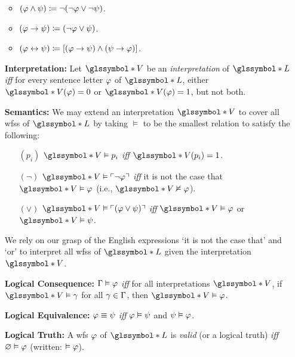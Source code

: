 \documentclass[a4paper, 11pt]{article} %
\newcommand{\g}{\glssymbol*}%
\begin{document}
\begin{enumerate}[leftmargin=1.2in,labelsep=.15in]
    \begin{itemize}\small
      \item $(\varphi\wedge \psi) \coloneq \neg(\neg \varphi\vee\neg \psi)$.
      \item $(\varphi\rightarrow \psi) \coloneq (\neg \varphi\vee \psi)$.
      \item $(\varphi\leftrightarrow \psi) \coloneq [(\varphi\rightarrow \psi)\wedge(\psi\rightarrow \varphi)]$.
    \end{itemize}
  \item[\bf Interpretation:] Let $\g{V}$ be an \textit{interpretation} of $\g{L}$ \textit{iff} for every sentence letter $\varphi$ of $\g{L}$, either $\g{V}(\metaA)=0$ or $\g{V}(\metaA)=1$, but not both.
  \item[\bf Semantics:] We may extend an interpretation $\g{V}$ to cover all wfss of $\g{L}$ by taking $\vDash$ to be the smallest relation to satisfy the following:
  \begin{itemize}[leftmargin=.36in]\small
  \item[$(p_i)$] $\g{V}\vDash p_i$ \textit{iff} $\g{V}(p_i)=1$.
  \item[$(\neg)$] $\g{V}\vDash \corner{\neg \metaA}$ \textit{iff} it is not the case that $\g{V}\vDash \metaA$ (i.e., $\g{V}\nvDash \metaA$). %
  \item[$(\vee)$] $\g{V}\vDash \corner{(\metaA\vee \metaB)}$ \textit{iff} $\g{V}\vDash \metaA$ or $\g{V}\vDash \metaB$.
  \end{itemize}
  We rely on our grasp of the English expressions `it is not the case that' and `or' to interpret all wfss of $\g{L}$ given the interpretation $\g{V}$. 
  \item[\bf Logical Consequence:] $\Gamma\vDash \varphi$ \textit{iff} for all interpretations $\g{V}$, if $\g{V}\vDash \metaG$ for all $\gamma\in\Gamma$, then $\g{V}\vDash \metaA$.
  \item[\bf Logical Equivalence:] $\varphi\equiv \psi$ \textit{iff} $\varphi\vDash \psi$ and $\psi\vDash \varphi$.  
  \item[\bf Logical Truth:] A wfs $\varphi$ of $\g{L}$ is \textit{valid} (or a logical truth) \textit{iff} $\varnothing\vDash \varphi$ (written: $\vDash \varphi$).
\end{enumerate}
\end{document}
